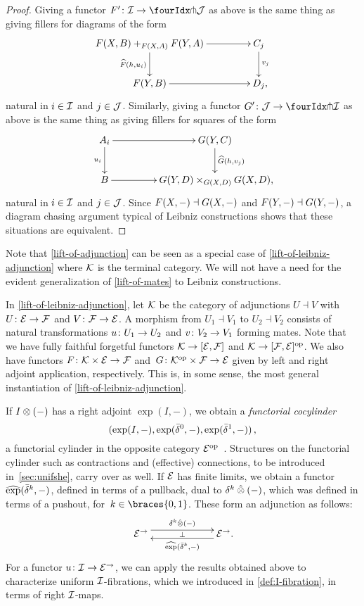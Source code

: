 \documentclass[reqno,10pt,a4paper,oneside,draft]{amsart}
\begin{document}
\begin{proof}
Giving a functor $F' \co \cal{I} \to \liftl{\cal{J}}$ as above is the same thing as giving fillers for diagrams of the form
\[
\xymatrix@C+2em{
  F(X,B) +_{F(X,A)} F(Y,A)
  \ar[d]_{\widehat{F}(h, u_i)}
  \ar[r]
&
  C_j
  \ar[d]^{v_j}
\\
  F(Y, B)
  \ar[r]
&
  D_j
\rlap{,}}
\]
natural in $i \in \cal{I}$ and $j \in \cal{J}$.
Similarly, giving a functor $G' \co \cal{J} \to \liftl{\cal{I}}$ as above is the same thing as giving fillers for squares of the form
\[
\xymatrix@C+2em{
  A_i
  \ar[d]_{u_i}
  \ar[r]
&
  G(Y, C)
  \ar[d]^{\widehat{G}(h, v_j)}
\\
  B
  \ar[r]
&
  G(Y, D) \times_{G(X,D)} G(X, D)
\rlap{,}}
\]
natural in $i \in \cal{I}$ and $j \in \cal{J}$.
Since $F(X, \arghole) \dashv G(X, \arghole)$ and $F(Y, \arghole) \dashv G(Y, \arghole)$, a diagram chasing argument typical of Leibniz constructions shows that these situations are
equivalent.
\end{proof}

Note that \cref{lift-of-adjunction} can be seen as a special case of \cref{lift-of-leibniz-adjunction} where $\cal{K}$ is the terminal category.
We will not have a need for the evident generalization of \cref{lift-of-mates} to Leibniz constructions.

\begin{remark} \label{pitchfork-leibniz-most-general-example}
In \cref{lift-of-leibniz-adjunction}, let $\cal{K}$ be the category of adjunctions $U \dashv V$ with $U \co \catE \to \cal{F}$ and $V \co \cal{F} \to \catE$.
A morphism from $U_1 \dashv V_1$ to $U_2 \dashv V_2$ consists of natural transformations $u \co U_1 \to U_2$ and $v \co V_2 \to V_1$ forming mates.
Note that we have fully faithful forgetful functors $\cal{K} \to [\catE, \cal{F}]$ and $\cal{K} \to [\cal{F}, \catE]^{\op}$.
We also have functors $F \co \cal{K} \times \catE \to \cal{F}$ and~$G \co \cal{K}^{\op} \times \cal{F} \to \catE$ given by left and right adjoint application, respectively.
This is, in some sense, the most general instantiation of \cref{lift-of-leibniz-adjunction}.
\end{remark}

If $\interval \otimes (-)$ has a right adjoint $\exp(I, -)$, we obtain a \emph{functorial cocylinder} \[
(\exp(\interval, -), \exp(\bar{\delta}^0, -), \exp(\bar{\delta}^1, -)) \, ,
\] 
\ie a functorial cylinder in the opposite category $\catE^{\op}$~\cite{kamps-porter:homotopy}.
Structures on the functorial cylinder such as contractions and (effective) connections, to
be introduced in~\cref{sec:unifshe}, carry over as well.
If $\calE$ has finite limits, we obtain a functor $\hatexp(\bar{\delta}^k, -)$, defined in terms of a pullback, dual to $\kcyl \hatotimes (-)$, which was defined in terms of a pushout, for~$k \in \braces{0, 1}$.
These form an adjunction as follows:
\[
\xymatrix@C+4em{
  \catE^\to
  \ar@<1ex>[r]^{\kcyl \hatotimes (-)}
  \ar@{}[r]|{\bot}
&
  \catE^\to
  \ar@<1ex>[l]^{\hatexp(\bar{\delta}^k, -)}
\rlap{.}}
\]
For a functor $u \co \cal{I} \to \catE^\to$, we can apply the results obtained above to characterize uniform $\cal{I}$-fibrations, which we introduced in \cref{def:I-fibration}, in terms of right $\cal{I}$-maps.
\end{document}
